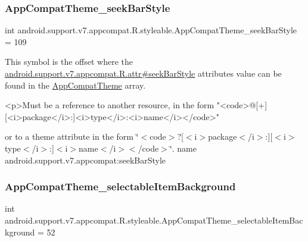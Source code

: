\subsubsection{\texorpdfstring{App\+Compat\+Theme\+\_\+seek\+Bar\+Style}{AppCompatTheme\_seekBarStyle}}
{\footnotesize\ttfamily int android.\+support.\+v7.\+appcompat.\+R.\+styleable.\+App\+Compat\+Theme\+\_\+seek\+Bar\+Style = 109\hspace{0.3cm}{\ttfamily [static]}}

This symbol is the offset where the \hyperlink{classandroid_1_1support_1_1v7_1_1appcompat_1_1R_1_1attr_aaa05c0c5eafda565ce4da73a3b31958c}{android.\+support.\+v7.\+appcompat.\+R.\+attr\#seek\+Bar\+Style} attribute\textquotesingle{}s value can be found in the \hyperlink{classandroid_1_1support_1_1v7_1_1appcompat_1_1R_1_1styleable_a5c42f89e8a410c323be34208d75c430b}{App\+Compat\+Theme} array.

\begin{DoxyVerb}      <p>Must be a reference to another resource, in the form "<code>@[+][<i>package</i>:]<i>type</i>:<i>name</i></code>"
\end{DoxyVerb}
 or to a theme attribute in the form \char`\"{}$<$code$>$?\mbox{[}$<$i$>$package$<$/i$>$\+:\mbox{]}\mbox{[}$<$i$>$type$<$/i$>$\+:\mbox{]}$<$i$>$name$<$/i$>$$<$/code$>$\char`\"{}.  name android.\+support.\+v7.\+appcompat\+:seek\+Bar\+Style \mbox{\label{classandroid_1_1support_1_1v7_1_1appcompat_1_1R_1_1styleable_ad19a8df967ad91c672478f779be959c7}} 
\subsubsection{\texorpdfstring{App\+Compat\+Theme\+\_\+selectable\+Item\+Background}{AppCompatTheme\_selectableItemBackground}}
{\footnotesize\ttfamily int android.\+support.\+v7.\+appcompat.\+R.\+styleable.\+App\+Compat\+Theme\+\_\+selectable\+Item\+Background = 52\hspace{0.3cm}{\ttfamily [static]}}

